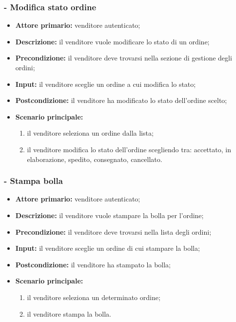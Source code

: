 \subsubsection{- Modifica stato ordine}
\begin{itemize}
    \item \textbf{Attore primario:} venditore autenticato;
    \item \textbf{Descrizione:} il venditore vuole modificare lo stato di un ordine;
    \item \textbf{Precondizione:} il venditore deve trovarsi nella sezione di gestione degli ordini;
    \item \textbf{Input:} il venditore sceglie un ordine a cui modifica lo stato;
    \item \textbf{Postcondizione:} il venditore ha modificato lo stato dell'ordine scelto;
    \item \textbf{Scenario principale:}
          \begin{enumerate}
              \item il venditore seleziona un ordine dalla lista;
              \item il venditore modifica lo stato dell'ordine scegliendo tra: accettato, in elaborazione, spedito, consegnato, cancellato.
          \end{enumerate}
\end{itemize}

\stepsubUserCase
\subsubsection{- Stampa bolla}
\begin{itemize}
    \item \textbf{Attore primario:} venditore autenticato;
    \item \textbf{Descrizione:} il venditore vuole stampare la bolla per l'ordine;
    \item \textbf{Precondizione:} il venditore deve trovarsi nella lista degli ordini;
    \item \textbf{Input:} il venditore sceglie un ordine di cui stampare la bolla;
    \item \textbf{Postcondizione:} il venditore ha stampato la bolla;
    \item \textbf{Scenario principale:}
          \begin{enumerate}
              \item il venditore seleziona un determinato ordine;
              \item il venditore stampa la bolla.
          \end{enumerate}
\end{itemize}

